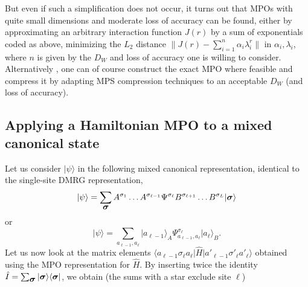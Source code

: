\documentclass[a4paper,10pt,oneside,onecolumn,1p,times]{elsarticle}
\newcommand{\bra}[1]{\mbox{$\langle #1  |$}}
\newcommand{\ket}[1]{\mbox{$| #1  \rangle$}}
\newcommand{\fat}[1]{\mbox{\boldmath$#1$\unboldmath}}	%
\begin{document}
But even if such a simplification does not occur, it turns out that MPOs with quite small dimensions and moderate loss of accuracy can be found, either by approximating an arbitrary interaction function $J(r)$ by a sum of exponentials coded as above\cite{VerstraetePirvu08,Crosswhite08a}, minimizing the $L_2$ distance $\| J(r) - \sum_{i=1}^n \alpha_i \lambda_i^r \|$ in $\alpha_i, \lambda_i$, where $n$ is given by the $D_W$ and loss of accuracy one is willing to consider. Alternatively \cite{Frowis10}, one can of course construct the exact MPO where feasible and compress it by adapting MPS compression techniques to an acceptable $D_W$ (and loss of accuracy). 

\subsection{Applying a Hamiltonian MPO to a mixed canonical state}
\label{subsec:Hamiltonianmixedcanonical}
Let us consider $\ket{\psi}$ in the following mixed canonical representation, identical to the single-site DMRG representation,
\begin{equation}
\ket{\psi} = \sum_{\fat{\sigma}} A^{\sigma_1} \ldots A^{\sigma_{\ell-1}} \Psi^{\sigma_{\ell}} B^{\sigma_{\ell+1}} \ldots B^{\sigma_L} \ket{\fat{\sigma}} 
\end{equation}
or 
\begin{equation}
\ket{\psi} = \sum_{a_{\ell-1},a_{\ell}} \ket{a_{\ell-1}}_A \Psi^{\sigma_{\ell}}_{a_{\ell-1}, a_{\ell}} \ket{a_{\ell}}_B .
\end{equation}
Let us now look at the matrix elements $\bra{a_{\ell-1} \sigma_{\ell} a_{\ell}} \hat{H}  \ket{a'_{\ell-1} \sigma'_{\ell} a'_{\ell}}$ obtained using the MPO representation for $\hat{H}$. By inserting twice the identity $\hat{I} = \sum_{\fat{\sigma}} \ket{\fat{\sigma}}\bra{\fat{\sigma}}$, we obtain (the sums with a star exclude site $\ell$)
\end{document}
